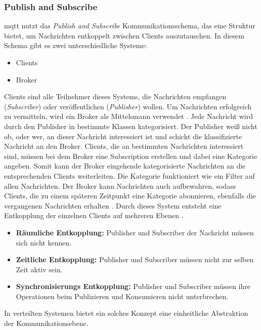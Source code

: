 \subsubsection{Publish and Subscribe} \label{s:publish-subscribe}
\ac{mqtt} nutzt das \textit{Publish and Subscribe} Kommunikationsschema, das eine Struktur bietet, um Nachrichten entkoppelt zwischen Clients auszutauschen. In diesem Schema gibt es zwei unterschiedliche Systeme:
\begin{itemize}
    \item Clients
    \item Broker
\end{itemize}
Clients sind alle Teilnehmer dieses Systems, die Nachrichten empfangen (\textit{Subscriber}) oder veröffentlichen (\textit{Publisher}) wollen. Um Nachrichten erfolgreich zu vermitteln, wird ein Broker als Mittelsmann verwendet \cite{teamGettingStartedMQTT}.
Jede Nachricht wird durch den Publisher in bestimmte Klassen kategorisiert. Der Publisher wei{\ss} nicht ob, oder wer, an dieser Nachricht interessiert ist und schickt die klassifizierte Nachricht an den Broker.
Clients, die an bestimmten Nachrichten interessiert sind, müssen bei dem Broker eine Subscription erstellen und dabei eine Kategorie angeben.
Somit kann der Broker eingehende kategorisierte Nachrichten an die entsprechenden Clients weiterleiten. Die Kategorie funktioniert wie ein Filter auf allen Nachrichten.
Der Broker kann Nachrichten auch aufbewahren, sodass Clients, die zu einem späteren Zeitpunkt eine Kategorie abonnieren, ebenfalls die vergangenen Nachrichten erhalten \cite{EverythingYouNeed}.
Durch dieses System entsteht eine Entkopplung der einzelnen Clients auf mehreren Ebenen \cite{teamPublishSubscribeMQTT}.
\begin{itemize}
    \item \textbf{Räumliche Entkopplung:} Publisher und Subscriber der Nachricht müssen sich nicht kennen. %
    \item \textbf{Zeitliche Entkopplung:} Publisher und Subscriber müssen nicht zur selben Zeit aktiv sein.
    \item \textbf{Synchronisierungs Entkopplung:} Publisher und Subscriber müssen ihre Operationen beim Publizieren und Konsumieren nicht unterbrechen.
\end{itemize}
In verteilten Systemen bietet ein solches Konzept eine einheitliche Abstraktion der Kommunikationsebene.
\cite{domingusDistributedSystemsIntroduction2020}
